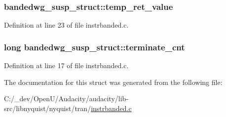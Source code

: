 \subsubsection[{\texorpdfstring{temp\+\_\+ret\+\_\+value}{temp_ret_value}}]{ bandedwg\+\_\+susp\+\_\+struct\+::temp\+\_\+ret\+\_\+value}\hypertarget{structbandedwg__susp__struct_ac5201254e6978ac2942cef886bb0586c}{}\label{structbandedwg__susp__struct_ac5201254e6978ac2942cef886bb0586c}


Definition at line 23 of file instrbanded.\+c.

\subsubsection[{\texorpdfstring{terminate\+\_\+cnt}{terminate_cnt}}]{\setlength{\rightskip}{0pt plus 5cm}long bandedwg\+\_\+susp\+\_\+struct\+::terminate\+\_\+cnt}\hypertarget{structbandedwg__susp__struct_a06a5e64eb8b6d0ba7f9210c92f70dcbe}{}\label{structbandedwg__susp__struct_a06a5e64eb8b6d0ba7f9210c92f70dcbe}


Definition at line 17 of file instrbanded.\+c.



The documentation for this struct was generated from the following file\+:\begin{DoxyCompactItemize}
\item 
C\+:/\+\_\+dev/\+Open\+U/\+Audacity/audacity/lib-\/src/libnyquist/nyquist/tran/\hyperlink{instrbanded_8c}{instrbanded.\+c}\end{DoxyCompactItemize}
